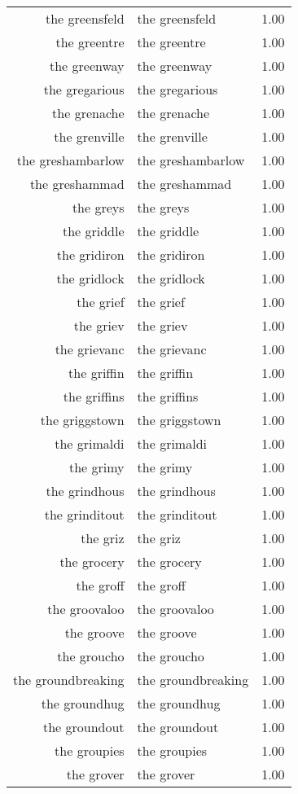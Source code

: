 \begin{table}[ht]
\begin{tabular}{rlr}
  the greensfeld & the greensfeld & 1.00 \\ 
  the greentre & the greentre & 1.00 \\ 
  the greenway & the greenway & 1.00 \\ 
  the gregarious & the gregarious & 1.00 \\ 
  the grenache & the grenache & 1.00 \\ 
  the grenville & the grenville & 1.00 \\ 
  the greshambarlow & the greshambarlow & 1.00 \\ 
  the greshammad & the greshammad & 1.00 \\ 
  the greys & the greys & 1.00 \\ 
  the griddle & the griddle & 1.00 \\ 
  the gridiron & the gridiron & 1.00 \\ 
  the gridlock & the gridlock & 1.00 \\ 
  the grief & the grief & 1.00 \\ 
  the griev & the griev & 1.00 \\ 
  the grievanc & the grievanc & 1.00 \\ 
  the griffin & the griffin & 1.00 \\ 
  the griffins & the griffins & 1.00 \\ 
  the griggstown & the griggstown & 1.00 \\ 
  the grimaldi & the grimaldi & 1.00 \\ 
  the grimy & the grimy & 1.00 \\ 
  the grindhous & the grindhous & 1.00 \\ 
  the grinditout & the grinditout & 1.00 \\ 
  the griz & the griz & 1.00 \\ 
  the grocery & the grocery & 1.00 \\ 
  the groff & the groff & 1.00 \\ 
  the groovaloo & the groovaloo & 1.00 \\ 
  the groove & the groove & 1.00 \\ 
  the groucho & the groucho & 1.00 \\ 
  the groundbreaking & the groundbreaking & 1.00 \\ 
  the groundhug & the groundhug & 1.00 \\ 
  the groundout & the groundout & 1.00 \\ 
  the groupies & the groupies & 1.00 \\ 
  the grover & the grover & 1.00 \\ 

\end{tabular}
\end{table}
